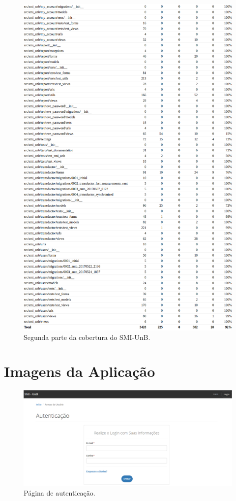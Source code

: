 \begin{apendicesenv}
\begin{figure}[!htpb]
    \centering
    \includegraphics[keepaspectratio=true,scale=0.45]{figuras/cobertura02.eps}
    \caption{Segunda parte da cobertura do SMI-UnB.}
    \label{cobertura02}
\end{figure}

\chapter{Imagens da Aplicação}
\begin{figure}[!htpb]
    \centering
    \includegraphics[keepaspectratio=true,scale=0.35]{figuras/img1.eps}
    \caption{Página de autenticação.}
    \label{img1}
\end{figure}


\end{apendicesenv}
